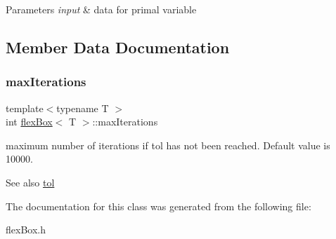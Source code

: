 \begin{DoxyParams}{Parameters}
{\em input} & data for primal variable \\
\hline
\end{DoxyParams}


\subsection{Member Data Documentation}
\mbox{\label{classflex_box_aa20a8abc40427d7a4b8c709f1e38318d}} 
\subsubsection{\texorpdfstring{max\+Iterations}{maxIterations}}
{\footnotesize\ttfamily template$<$typename T $>$ \\
int \hyperlink{classflex_box}{flex\+Box}$<$ T $>$\+::max\+Iterations}



maximum number of iterations if tol has not been reached. Default value is 10000. 

\begin{DoxySeeAlso}{See also}
\hyperlink{classflex_box_acd4f987e22eb761cff9f6c98592808b4}{tol} 
\end{DoxySeeAlso}


The documentation for this class was generated from the following file\+:\begin{DoxyCompactItemize}
\item 
flex\+Box.\+h\end{DoxyCompactItemize}
